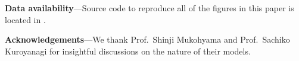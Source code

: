 \documentclass[prd,twocolumn,aps,psfig,nofootinbib,nobibnotes,superscriptaddress,preprintnumbers,times]{revtex4-2}
\begin{document}

\vspace{2mm}
{\bf Data availability}---Source code to reproduce all of the figures in this paper is located in \cite{GH}. 
\vspace{2mm}

{\bf Acknowledgements}---We thank Prof.\ Shinji Mukohyama and Prof.\ Sachiko Kuroyanagi for insightful discussions on the nature of their models.





\clearpage
\end{document}
